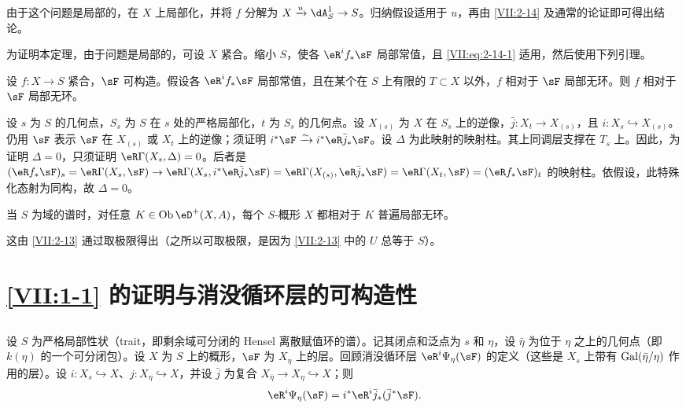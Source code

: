 由于这个问题是局部的，在 $X$ 上局部化，并将 $f$ 分解为 $X\xrightarrow u \dA_S^1 \to S$。归纳假设适用于 $u$，再由 \ref{VII:2-14} 及通常的论证即可得出结论。

为证明本定理，由于问题是局部的，可设 $X$ 紧合。缩小 $S$，使各 $\eR^i f_\ast \sF$ 局部常值，且 \eqref{VII:eq:2-14-1} 适用，然后使用下列引理。

\begin{lemma_}\label{VII:2-15}
设 $f:X\to S$ 紧合，$\sF$ 可构造。假设各 $\eR^i f_\ast \sF$ 局部常值，且在某个在 $S$ 上有限的 $T\subset X$ 以外，$f$ 相对于 $\sF$ 局部无环。则 $f$ 相对于 $\sF$ 局部无环。
\end{lemma_}

设 $s$ 为 $S$ 的几何点，$S_s$ 为 $S$ 在 $s$ 处的严格局部化，$t$ 为 $S_s$ 的几何点。设 $X_{(s)}$ 为 $X$ 在 $S_s$ 上的逆像，$\bar j:X_t \to X_{(s)}$，且 $i:X_s \hookrightarrow X_{(s)}$。仍用 $\sF$ 表示 $\sF$ 在 $X_{(s)}$ 或 $X_t$ 上的逆像；须证明 $i^\ast \sF \iso i^\ast \eR \bar j_\ast \sF$。设 $\Delta$ 为此映射的映射柱。其上同调层支撑在 $T_s$ 上。因此，为证明 $\Delta=0$，只须证明 $\eR\Gamma(X_s,\Delta)=0$。后者是
$(\eR f_\ast \sF)_s = \eR\Gamma(X_s,\sF) \to \eR\Gamma(X_s,i^\ast \eR\bar j_\ast \sF) = \eR\Gamma(X_{(s)},\eR\bar j_\ast \sF) = \eR\Gamma(X_t,\sF) = (\eR f_\ast \sF)_t$
的映射柱。依假设，此特殊化态射为同构，故 $\Delta=0$。

\begin{corollary_}\label{VII:2-16}
当 $S$ 为域的谱时，对任意 $K\in\ob\eD^+(X,A)$，每个 $S$-概形 $X$ 都相对于 $K$ 普遍局部无环。
\end{corollary_}

这由 \ref{VII:2-13} 通过取极限得出（之所以可取极限，是因为 \ref{VII:2-13} 中的 $U$ 总等于 $S$）。

\section{\texorpdfstring{\ref{VII:1-1}}{1.1} 的证明与消没循环层的可构造性}\label{VII:3}

\subsection{}\label{VII:3-1}

设 $S$ 为严格局部性状（trait，即剩余域可分闭的 Hensel 离散赋值环的谱）。记其闭点和泛点为 $s$ 和 $\eta$，设 $\bar\eta$ 为位于 $\eta$ 之上的几何点（即 $k(\eta)$ 的一个可分闭包）。设 $X$ 为 $S$ 上的概形，$\sF$ 为 $X_\eta$ 上的层。回顾消没循环层 $\eR^i \Psi_\eta(\sF)$ 的定义（这些是 $X_s$ 上带有 $\operatorname{Gal}(\bar\eta/\eta)$ 作用的层）。设 $i:X_s\hookrightarrow X$、$j:X_\eta \hookrightarrow X$，并设 $\bar j$ 为复合 $X_{\bar\eta}\to X_\eta \hookrightarrow X$；则
\[
  \eR^i \Psi_\eta(\sF) = i^\ast \eR^i \bar j_\ast (\bar j^\ast \sF) \text{.}
\]

